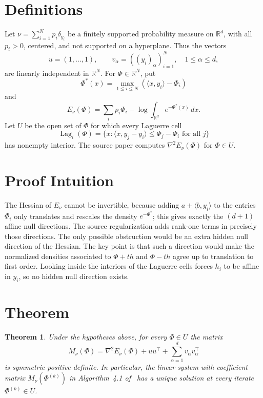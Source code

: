 \documentclass[11pt]{article}
\newtheorem{theorem}{Theorem}
\newcommand{\R}{\mathbb{R}}
\newcommand{\Lag}{\operatorname{Lag}}
\begin{document}
\section*{Definitions}

Let $\nu=\sum_{i=1}^N p_i\delta_{y_i}$ be a finitely supported probability measure on $\R^d$, with all $p_i>0$, centered, and not supported on a hyperplane.  Thus the vectors
\[
u=(1,\ldots,1),\qquad v_\alpha=((y_i)_\alpha)_{i=1}^N,\quad 1\le \alpha\le d,
\]
are linearly independent in $\R^N$.  For $\Phi\in\R^N$, put
\[
\Phi^*(x)=\max_{1\le i\le N}(\langle x,y_i\rangle-\Phi_i)
\]
and
\[
E_\nu(\Phi)=\sum_i p_i\Phi_i-\log\int_{\R^d}e^{-\Phi^*(x)}\,dx.
\]
Let $U$ be the open set of $\Phi$ for which every Laguerre cell
\[
\Lag_i(\Phi)=\{x:\langle x,y_j-y_i\rangle\le \Phi_j-\Phi_i\text{ for all }j\}
\]
has nonempty interior.  The source paper computes $\nabla^2E_\nu(\Phi)$ for $\Phi\in U$.

\section*{Proof Intuition}

The Hessian of $E_\nu$ cannot be invertible, because adding $a+\langle b,y_i\rangle$ to the entries $\Phi_i$ only translates and rescales the density $e^{-\Phi^*}$; this gives exactly the $(d+1)$ affine null directions.  The source regularization adds rank-one terms in precisely those directions.  The only possible obstruction would be an extra hidden null direction of the Hessian.  The key point is that such a direction would make the normalized densities associated to $\Phi+t h$ and $\Phi-t h$ agree up to translation to first order.  Looking inside the interiors of the Laguerre cells forces $h_i$ to be affine in $y_i$, so no hidden null direction exists.

\section*{Theorem}

\begin{theorem}
\label{thm:pd}
Under the hypotheses above, for every $\Phi\in U$ the matrix
\[
M_\nu(\Phi)=\nabla^2E_\nu(\Phi)+u u^\top+\sum_{\alpha=1}^d v_\alpha v_\alpha^\top
\]
is symmetric positive definite.  In particular, the linear system with coefficient matrix $M_\nu(\Phi^{(k)})$ in Algorithm~4.1 of~\cite{BR} has a unique solution at every iterate $\Phi^{(k)}\in U$.
\end{theorem}
\end{document}
